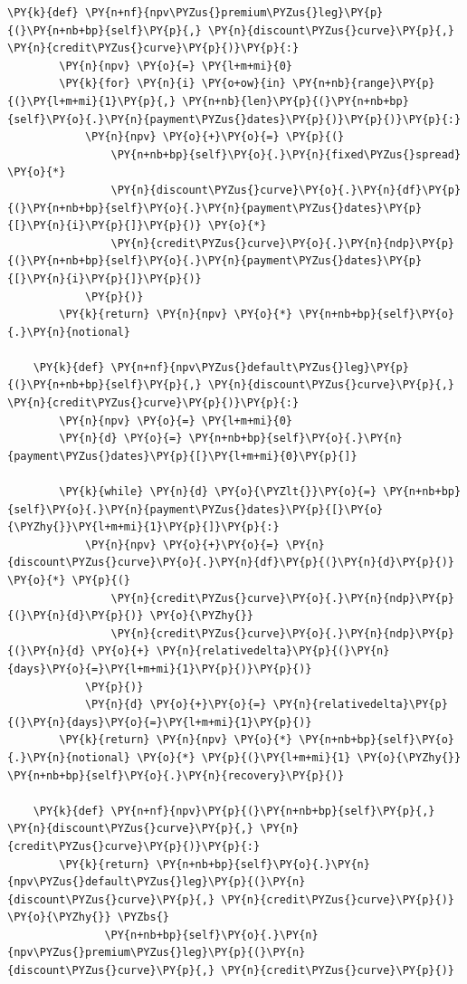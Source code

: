 {\begin{tcolorbox}[breakable, size=fbox, boxrule=1pt, pad at break*=1mm,colback=cellbackground, colframe=cellborder]
\begin{Verbatim}[commandchars=\\\{\}]
    \PY{k}{def} \PY{n+nf}{npv\PYZus{}premium\PYZus{}leg}\PY{p}{(}\PY{n+nb+bp}{self}\PY{p}{,} \PY{n}{discount\PYZus{}curve}\PY{p}{,} \PY{n}{credit\PYZus{}curve}\PY{p}{)}\PY{p}{:}
        \PY{n}{npv} \PY{o}{=} \PY{l+m+mi}{0}
        \PY{k}{for} \PY{n}{i} \PY{o+ow}{in} \PY{n+nb}{range}\PY{p}{(}\PY{l+m+mi}{1}\PY{p}{,} \PY{n+nb}{len}\PY{p}{(}\PY{n+nb+bp}{self}\PY{o}{.}\PY{n}{payment\PYZus{}dates}\PY{p}{)}\PY{p}{)}\PY{p}{:}
            \PY{n}{npv} \PY{o}{+}\PY{o}{=} \PY{p}{(}
                \PY{n+nb+bp}{self}\PY{o}{.}\PY{n}{fixed\PYZus{}spread} \PY{o}{*}
                \PY{n}{discount\PYZus{}curve}\PY{o}{.}\PY{n}{df}\PY{p}{(}\PY{n+nb+bp}{self}\PY{o}{.}\PY{n}{payment\PYZus{}dates}\PY{p}{[}\PY{n}{i}\PY{p}{]}\PY{p}{)} \PY{o}{*}
                \PY{n}{credit\PYZus{}curve}\PY{o}{.}\PY{n}{ndp}\PY{p}{(}\PY{n+nb+bp}{self}\PY{o}{.}\PY{n}{payment\PYZus{}dates}\PY{p}{[}\PY{n}{i}\PY{p}{]}\PY{p}{)}
            \PY{p}{)}
        \PY{k}{return} \PY{n}{npv} \PY{o}{*} \PY{n+nb+bp}{self}\PY{o}{.}\PY{n}{notional}
    
    \PY{k}{def} \PY{n+nf}{npv\PYZus{}default\PYZus{}leg}\PY{p}{(}\PY{n+nb+bp}{self}\PY{p}{,} \PY{n}{discount\PYZus{}curve}\PY{p}{,} \PY{n}{credit\PYZus{}curve}\PY{p}{)}\PY{p}{:}
        \PY{n}{npv} \PY{o}{=} \PY{l+m+mi}{0}
        \PY{n}{d} \PY{o}{=} \PY{n+nb+bp}{self}\PY{o}{.}\PY{n}{payment\PYZus{}dates}\PY{p}{[}\PY{l+m+mi}{0}\PY{p}{]}
        
        \PY{k}{while} \PY{n}{d} \PY{o}{\PYZlt{}}\PY{o}{=} \PY{n+nb+bp}{self}\PY{o}{.}\PY{n}{payment\PYZus{}dates}\PY{p}{[}\PY{o}{\PYZhy{}}\PY{l+m+mi}{1}\PY{p}{]}\PY{p}{:}
            \PY{n}{npv} \PY{o}{+}\PY{o}{=} \PY{n}{discount\PYZus{}curve}\PY{o}{.}\PY{n}{df}\PY{p}{(}\PY{n}{d}\PY{p}{)} \PY{o}{*} \PY{p}{(}
                \PY{n}{credit\PYZus{}curve}\PY{o}{.}\PY{n}{ndp}\PY{p}{(}\PY{n}{d}\PY{p}{)} \PY{o}{\PYZhy{}}
                \PY{n}{credit\PYZus{}curve}\PY{o}{.}\PY{n}{ndp}\PY{p}{(}\PY{n}{d} \PY{o}{+} \PY{n}{relativedelta}\PY{p}{(}\PY{n}{days}\PY{o}{=}\PY{l+m+mi}{1}\PY{p}{)}\PY{p}{)}
            \PY{p}{)}
            \PY{n}{d} \PY{o}{+}\PY{o}{=} \PY{n}{relativedelta}\PY{p}{(}\PY{n}{days}\PY{o}{=}\PY{l+m+mi}{1}\PY{p}{)}
        \PY{k}{return} \PY{n}{npv} \PY{o}{*} \PY{n+nb+bp}{self}\PY{o}{.}\PY{n}{notional} \PY{o}{*} \PY{p}{(}\PY{l+m+mi}{1} \PY{o}{\PYZhy{}} \PY{n+nb+bp}{self}\PY{o}{.}\PY{n}{recovery}\PY{p}{)}
    
    \PY{k}{def} \PY{n+nf}{npv}\PY{p}{(}\PY{n+nb+bp}{self}\PY{p}{,} \PY{n}{discount\PYZus{}curve}\PY{p}{,} \PY{n}{credit\PYZus{}curve}\PY{p}{)}\PY{p}{:}
        \PY{k}{return} \PY{n+nb+bp}{self}\PY{o}{.}\PY{n}{npv\PYZus{}default\PYZus{}leg}\PY{p}{(}\PY{n}{discount\PYZus{}curve}\PY{p}{,} \PY{n}{credit\PYZus{}curve}\PY{p}{)} \PY{o}{\PYZhy{}} \PYZbs{}
               \PY{n+nb+bp}{self}\PY{o}{.}\PY{n}{npv\PYZus{}premium\PYZus{}leg}\PY{p}{(}\PY{n}{discount\PYZus{}curve}\PY{p}{,} \PY{n}{credit\PYZus{}curve}\PY{p}{)}
\end{Verbatim}
\end{tcolorbox}    

}
